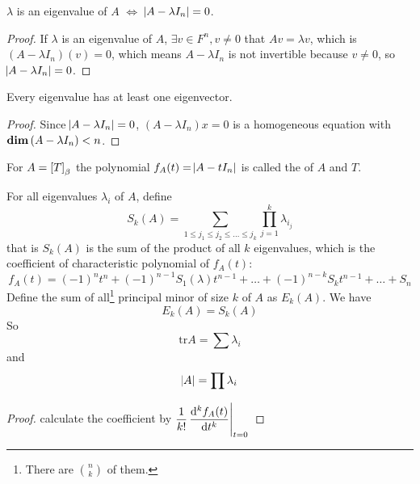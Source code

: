 \begin{theorem}
    $\lambda$ is an eigenvalue of $A$ $\iff$ $\abs{A - \lambda I_n} = 0$.
\end{theorem}

\begin{proof}
    If $\lambda$ is an eigenvalue of $A$, $\exists v \in F^n, v \neq 0$ that $A v = \lambda v$, which is $(A - \lambda I_n)(v)= 0$, which means $A - \lambda I_n$ is not invertible because $v \neq 0$, so $\abs{A - \lambda I_n} = 0$.
\end{proof}

\begin{theorem}
    Every eigenvalue has at least one eigenvector.    
\end{theorem}
\begin{proof}
    Since $\abs{A - \lambda I_n} = 0$, $(A - \lambda I_n) x = 0$ is a homogeneous equation with $\displaystyle \mathbf{dim}\left( A - \lambda I_n \right) < n$.
\end{proof}



\begin{definition}
    For $A = \coordinate{T}_\beta$ the polynomial $f_A(t) = \abs{A - t I_n}$ is called the  of $A$ and $T$. 
\end{definition}

\begin{theorem}
    For all eigenvalues $\lambda_i$ of $A$, define 
    \begin{equation}
        S_k(A) = \sum_{1\leq j_1 \leq j_2 \leq \dots \leq j_k} \prod_{j=1}^k \lambda_{i_j}
    \end{equation}
    that is $S_k(A)$ is the sum of the product of all $k$ eigenvalues, which is the coefficient of characteristic polynomial of $f_A(t)$:
    \begin{equation}
        f_A(t) = (-1)^n t^n + (-1)^{n-1} S_{1}(\lambda)t^{n-1} + \dots + (-1)^{n-k} S_{k} t^{n-1} + \dots + S_{n}
    \end{equation}
    Define the sum of all\footnote{There are $\binom{n}{k}$ of them.} principal minor of size $k$ of $A$ as $E_k(A)$. We have
    \begin{equation}
        E_k(A) = S_k(A)
    \end{equation}
    So 
    \begin{equation}
        \text{tr} A = \sum \lambda_i
    \end{equation}
    and 
    \begin{equation}
        \abs{A} = \prod \lambda_i
    \end{equation}
\end{theorem}
\begin{proof}
    calculate the coefficient by $\displaystyle \frac{1}{k!} \eval{\dod[k]{f_A(t)}{t}}_{t = 0}$
\end{proof}



